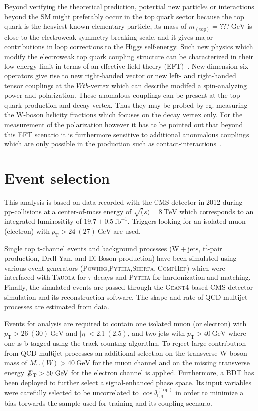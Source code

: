 \documentclass[a4paper]{jpconf}
\newcommand{\unit}[1]{\ensuremath{\mathrm{~#1}}}
\newcommand{\wjets}[0]{\mathrm{W+jets}}
\newcommand{\particle}[1]{\ensuremath{#1}}
\newcommand{\ttbar}[0]{\ensuremath{\mathrm{t\bar{t}}}}
\newcommand{\costheta}[0]{\cos\theta_{\mathrm{l,q}}^{\mathrm{(top)}}}
\newcommand{\pT}[0]{\ensuremath{p_\mathrm{T}}}
\newcommand{\mtw}[0]{\ensuremath{M_\mathrm{T}(W)}}
\newcommand{\met}[0]{\ensuremath{\slashed E_\mathrm{T}}}
\begin{document}
Beyond verifying the theoretical prediction, potential new particles or interactions beyond the SM might preferably occur in the top quark sector because the top quark is the heaviest known elementary particle, its mass of $m_{\mathrm{(top)}}=???\unit{GeV}$ is close to the electroweak symmetry breaking scale, and it gives major contributions in loop corrections to the Higgs self-energy. Such new physics which modify the electroweak top quark coupling structure can be characterized in their low energy limit in terms of an effective field theory (EFT)~\cite{jaaswpol}. New dimension six operators give rise to new right-handed vector or new left- and right-handed tensor couplings at the $\particle{Wtb}$-vertex which can describe modifed a spin-analyzing power and polarization. These anomalous couplings can be present at the top quark production and decay vertex. Thus they may be probed by eg. measuring the W-boson helicity fractions which focuses on the decay vertex only. For the measurement of the polarization however it has to be pointed out that beyond this EFT scenario it is furthermore sensitive to additional anonmalous couplings which are only possible in the production such as contact-interactions~\cite{fabian}.


\section{Event selection}
This analysis is based on data recorded with the CMS detector in 2012 during pp-collisions at a center-of-mass energy of $\sqrt(s)=8\unit{TeV}$ which corresponds to an integrated luminositity of $19.7\pm0.5\unit{fb^{-1}}$. Triggers looking for an isolated muon (electron) with $\pT>24~(27)\unit{GeV}$ are used.


Single top t-channel events and background processes ($\wjets$, $\ttbar$-pair production, Drell-Yan, and Di-Boson production) have been simulated using various event generators (\textsc{Powheg},\textsc{Pythia},\textsc{Sherpa}, \textsc{CompHep}) which were interfaced with \textsc{Tauola} for $\tau$ decays and \textsc{Pythia} for hardonization and matching. Finally, the simulated events are passed through the \textsc{Geant4}-based CMS detector simulation and its reconstruction software. The shape and rate of QCD multijet processes are estimated from data.


Events for analysis are required to contain one isolated muon (or electron) with $\pT>26~(30)\unit{GeV}$ and $|\eta|<2.1~(2.5)$, and two jets with $\pT>40\unit{GeV}$ where one is b-tagged using the track-counting algorithm. To reject large contribution from QCD multijet processes an additional selection on the transverse W-boson mass of $\mtw>40\unit{GeV}$ for the muon channel and on the missing transverse energy $\met>50\unit{GeV}$ for the electron channel is applied. Furthermore, a BDT has been deployed to further select a signal-enhanced phase space. Its input variables were carefully selected to be uncorrelated to $\costheta$ in order to minimize a bias torwards the sample used for training and its coupling scenario.
\end{document}
